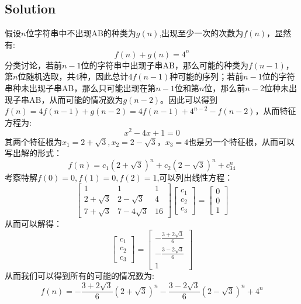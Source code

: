 \documentclass[a4paper]{ctexart}
\begin{document}
\subsection{Solution}
假设$n$位字符串中不出现AB的种类为$g(n)$,出现至少一次的次数为$f(n)$，显然有:
\begin{equation}
    f(n) + g(n) = 4^n
\end{equation}
分类讨论，若前$n-1$位的字符串中出现子串AB，那么可能的种类为$f(n-1)$，第$n$位随机选取，共$4$种，因此总计$4f(n-1)$种可能的序列；若前$n-1$位的字符串种未出现子串AB，那么只可能出现在第$n-1$位和第$n$位，那么前$n-2$位种未出现子串AB，从而可能的情况数为$g(n-2)$。因此可以得到$f(n)=4f(n-1)+g(n-2)=4f(n-1)+4^{n-2}-f(n-2)$，从而特征方程为:
\begin{equation}
    x^2-4x+1=0
\end{equation}
其两个特征根为$x_1=2+\sqrt{3},x_2=2-\sqrt{3}$，$x_3=4$也是另一个特征根，从而可以写出解的形式：
\begin{equation}
    f(n)=c_1(2+\sqrt{3})^n+c_2(2-\sqrt{3})^n+c_34^n
\end{equation}
考察特解$f(0)=0,f(1)=0,f(2)=1$,可以列出线性方程：
\begin{equation}
    \left[
        \begin{array}{ccc}
            1          & 1           & 1  \\
            2+\sqrt{3} & 2-\sqrt{3}  & 4  \\
            7+\sqrt{3} & 7-4\sqrt{3} & 16
        \end{array}
        \right]
    \left[
        \begin{array}{c}
            c_{1} \\
            c_{2} \\
            c_{3}
        \end{array}
        \right]
    =
    \left[
        \begin{array}{c}
            0 \\
            0 \\
            1
        \end{array}
        \right]
\end{equation}
从而可以解得：
\begin{equation}
    \left[
        \begin{array}{c}
            c_1 \\
            c_2 \\
            c_3
        \end{array}
        \right]
    =
    \left[
        \begin{array}{c}
            -\frac{3+2\sqrt{3}}{6} \\
            -\frac{3-2\sqrt{3}}{6} \\
            1
        \end{array}
        \right]
\end{equation}
从而我们可以得到所有的可能的情况数为:
\begin{equation}
    f(n) = -\frac{3+2\sqrt{3}}{6}(2+\sqrt{3})^n-\frac{3-2\sqrt{3}}{6}(2-\sqrt{3})^n+4^n
\end{equation}
\end{document}
